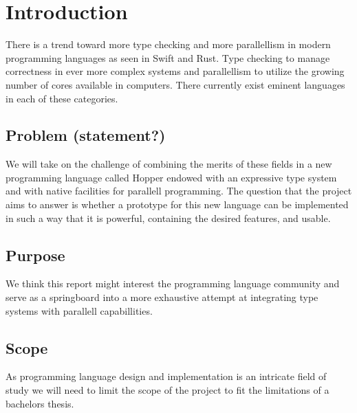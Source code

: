 \chapter{Introduction}


There is a trend toward more type checking and more parallellism in modern programming languages as seen in Swift\cite{swift} and Rust\cite{rust}. Type checking to manage correctness in ever more complex systems and  parallellism to utilize the growing number of cores available in computers. There currently exist eminent languages in each of these categories.

\section{Problem (statement?)}

 We will take on the challenge of combining the merits of these fields in a new programming language called Hopper endowed with an expressive type system and with native facilities for parallell programming. The question that the project aims to answer is whether a prototype for this new language can be implemented in such a way that it is powerful, containing the desired features, and usable.

\section{Purpose}




We think this report might interest the programming language community and serve as a springboard into a more exhaustive attempt at integrating type systems with parallell capabillities.

\section{Scope}

As programming language design and implementation is an intricate field of study we will need to limit the scope of the project to fit the limitations of a bachelors thesis. 

